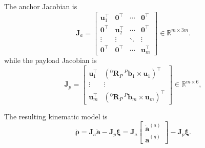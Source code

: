 \noindent The anchor Jacobian is
\begin{equation}
    \mathbf{J}_a
    =
    \begin{bmatrix}
        \mathbf{u}_1^\top & \mathbf{0}^\top & \cdots & \mathbf{0}^\top \\
        \mathbf{0}^\top & \mathbf{u}_2^\top & \cdots & \mathbf{0}^\top \\
        \vdots & \vdots & \ddots & \vdots \\
        \mathbf{0}^\top & \mathbf{0}^\top & \cdots & \mathbf{u}_m^\top
    \end{bmatrix}
    \in\mathbb{R}^{m\times3m}.
    \label{eq:Ja}
\end{equation}
while the payload Jacobian is
\begin{equation}
    \mathbf{J}_p
    =
    \begin{bmatrix}
        \mathbf{u}_1^\top &
        \left(
            {}^0\mathbf{R}_P\,{}^P\mathbf{b}_1
            \times
            \mathbf{u}_1
        \right)^\top
        \\
        \vdots & \vdots
        \\
        \mathbf{u}_m^\top &
        \left(
            {}^0\mathbf{R}_P\,{}^P\mathbf{b}_m
            \times
            \mathbf{u}_m
        \right)^\top
    \end{bmatrix}
    \label{eq:jp}
    \in\mathbb{R}^{m\times6},
\end{equation}


\noindent The resulting kinematic model is
\begin{equation}
    \dot{\boldsymbol{\rho}}
    =
    \mathbf{J}_a\dot{\mathbf{a}}
    -
    \mathbf{J}_p\boldsymbol{\xi}
    =
    \mathbf{J}_a
    \begin{bmatrix}
        \dot{\mathbf{a}}^{(a)} \\
        \dot{\mathbf{a}}^{(g)}
    \end{bmatrix}
    -
    \mathbf{J}_p\boldsymbol{\xi}.
    \label{eq:kinematic_model}
\end{equation}


